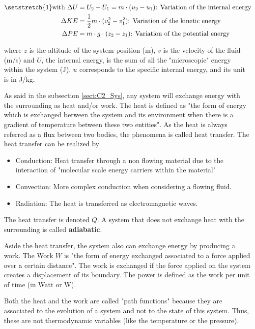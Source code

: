 \begin{align*}
\setstretch{1}
    \text{with } \Delta U  &= U_2 - U_1 =  m\cdot(u_2 - u_1) \text{: Variation of the internal energy}\\
                 \Delta KE &= \frac{1}{2}m\cdot(v^2_2 - v^2_1)\text{: Variation of the kinetic energy}\\
                 \Delta PE &= m\cdot g\cdot(z_2 - z_1)\text{: Variation of the potential energy}
\end{align*} 

where $z$ is the altitude of the system position (m), $v$ is the velocity of the fluid (m/s) and $U$, the internal energy, is the sum of all the "microscopic" energy within the system (J). $u$ corresponds to the specific internal energy, and its unit is in J/kg.

As said in the subsection \ref{sect:C2_Sys}, any system will exchange energy with the surrounding as heat and/or work. The heat is defined as "the form of energy which is exchanged between the system and its environment when there is a gradient of temperature between these two entities". As the heat is always referred as a flux between two bodies, the phenomena is called heat transfer. The heat transfer can be realized by
\begin{itemize}
    \item Conduction: Heat transfer through a non flowing material due to the interaction of "molecular scale energy carriers within the material"\cite{GregoryNellis2015}
    \item Convection: More complex conduction when considering a flowing fluid.
    \item Radiation: The heat is transferred as electromagnetic waves.
\end{itemize}
The heat transfer is denoted $Q$. A system that does not exchange heat with the surrounding is called \textbf{adiabatic}.

Aside the heat transfer, the system also can exchange energy by producing a work. The Work $W$ is "the form of energy exchanged associated to a force applied over a certain distance". The work is exchanged if the force applied on the system creates a displacement of its boundary. The power is defined as the work per unit of time (in Watt or W).

Both the heat and the work are called "path functions" because they are associated to the evolution of a system and not to the state of this system. Thus, these are not thermodynamic variables (like the temperature or the pressure).

